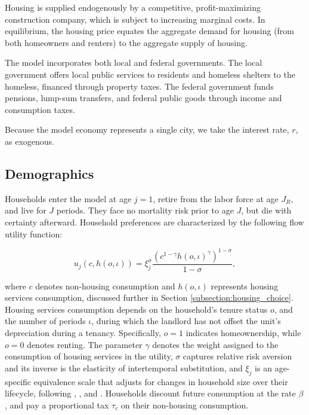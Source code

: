 \documentclass[parskip=full]{article}
\begin{document}
Housing is supplied endogenously by a competitive, profit-maximizing construction company, which is subject to increasing marginal costs. In equilibrium, the housing price equates the aggregate demand for housing (from both homeowners and renters) to the aggregate supply of housing.

The model incorporates both local and federal governments. The local government offers local public services to residents and homeless shelters to the homeless, financed through property taxes. The federal government funds pensions, lump-sum transfers, and federal public goods through income and consumption taxes.

Because the model economy represents a single city, we take the interest rate, $r$, as exogenous. 

\subsection{Demographics}\label{subsection:demographics}

Households enter the model at age $j=1$, retire from the labor force at age $J_{R}$, and live for $J$ periods. They face no mortality risk prior to age $J$, but die with certainty afterward. Household preferences are characterized by the following flow utility function:

\begin{equation*}
    u_{j}(c,h(o,\iota))=\xi_{j}^{\sigma}\frac{\left(c^{1-\gamma} h(o,\iota)^{\gamma}\right)^{1-\sigma}}{1-\sigma},
\end{equation*}

\noindent where $c$ denotes non-housing consumption and $h(o,\iota)$ represents housing services consumption, discussed further in Section \ref{subsection:housing_choice}. Housing services consumption depends on the household’s tenure status $o$, and the number of periods $\iota$, during which the landlord has not offset the unit's depreciation during a tenancy. Specifically, $o=1$ indicates homeownership, while $o=0$ denotes renting. The parameter $\gamma$ denotes the weight assigned to the consumption of housing services in the utility, $\sigma$ captures relative risk aversion and its inverse is the elasticity of intertemporal substitution, and $\xi_{j}$ is an age-specific equivalence scale that adjusts for changes in household size over their lifecycle, following \citet{lm-1980}, \citet{wz-2010}, and \citet{xu-2013}. Households discount future consumption at the rate $\beta$, and pay a proportional tax $\tau_{c}$ on their non-housing consumption.
\end{document}

